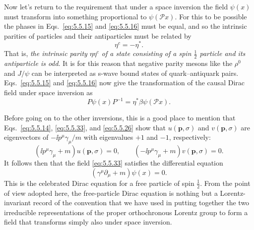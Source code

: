 Now let's return to the requirement that under a space inversion the field
$\psi(x)$ must transform into something proportional to $\psi(\mathcal P x)$.
For this to be possible the phases in Eqs.~\eqref{eq:5.5.15} and \eqref{eq:5.5.16} must be
equal, and so the intrinsic parities of particles and their antiparticles must
be related by
\begin{equation}
\eta^c=-\eta^*.
\tag{5.5.40}\label{eq:5.5.40}
\end{equation}
That is, \emph{the intrinsic parity $\eta\eta^c$ of a state consisting of a
spin $\frac12$ particle and its antiparticle is odd}. It is for this reason
that negative parity mesons like the $\rho^0$ and $J/\psi$ can be interpreted
as s-wave bound states of quark--antiquark pairs. Eqs.~\eqref{eq:5.5.15} and \eqref{eq:5.5.16}
now give the transformation of the causal Dirac field under space inversion as
\begin{equation}
P\psi(x)P^{-1}=\eta^*\beta\psi(\mathcal P x).
\tag{5.5.41}\label{eq:5.5.41}
\end{equation}

Before going on to the other inversions, this is a good place to mention that
Eqs.~\eqref{eq:5.5.14}, \eqref{eq:5.5.33}, and \eqref{eq:5.5.26} show that $u(\mathbf p,\sigma)$ and
$v(\mathbf p,\sigma)$ are eigenvectors of $-\ii p^\mu\gamma_\mu/m$ with
eigenvalues $+1$ and $-1$, respectively:
\begin{equation}
(\ii p^\mu\gamma_\mu+m)u(\mathbf p,\sigma)=0,
\qquad
(-\ii p^\mu\gamma_\mu+m)v(\mathbf p,\sigma)=0.
\tag{5.5.42}\label{eq:5.5.42}
\end{equation}
It follows then that the field \eqref{eq:5.5.33} satisfies the differential equation
\begin{equation}
(\gamma^\mu\partial_\mu+m)\psi(x)=0.
\tag{5.5.43}\label{eq:5.5.43}
\end{equation}
This is the celebrated Dirac equation for a free particle of spin $\frac12$.
From the point of view adopted here, the free-particle Dirac equation is
nothing but a Lorentz-invariant record of the convention that we have used in
putting together the two irreducible representations of the proper
orthochronous Lorentz group to form a field that transforms simply also under
space inversion.

